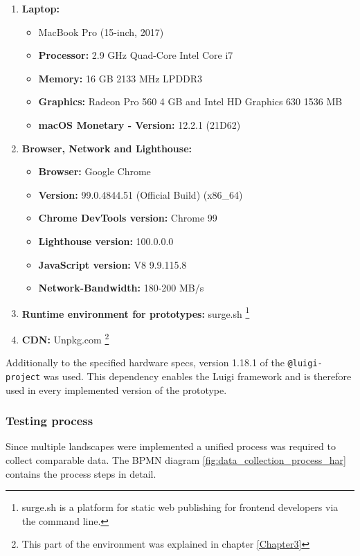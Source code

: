\begin{enumerate}
	\item \textbf{Laptop:}
	\begin{itemize}[noitemsep]
		\item MacBook Pro (15-inch, 2017)
		\item \textbf{Processor:} 2.9 GHz Quad-Core Intel Core i7
		\item \textbf{Memory:} 16 GB 2133 MHz LPDDR3 
		\item \textbf{Graphics:} Radeon Pro 560 4 GB and Intel HD Graphics 630 1536 MB
		\item \textbf{macOS Monetary - Version:} 12.2.1 (21D62)
	\end{itemize} 

	\item \textbf{Browser, Network and Lighthouse:}
	\begin{itemize}[noitemsep]
		\item \textbf{Browser:} Google Chrome
		\item \textbf{Version:} 99.0.4844.51 (Official Build) (x86\_64)
		\item \textbf{Chrome DevTools version:} Chrome 99
		\item \textbf{Lighthouse version:} 100.0.0.0
		\item \textbf{JavaScript version:} V8 9.9.115.8
		\item \textbf{Network-Bandwidth:} 180-200 MB/s
	\end{itemize}

	\item \textbf{Runtime environment for prototypes:} surge.sh \footnote{surge.sh is a platform for static web publishing
		for frontend developers via the command line.}
	
	\item \textbf{CDN:} Unpkg.com \footnote{This part of the environment was explained in chapter \ref{Chapter3}}
\end{enumerate}

Additionally to the specified hardware specs, version 1.18.1 of the \texttt{@luigi-project} was used. This dependency enables the Luigi framework and is therefore used in every implemented version of the prototype.

\subsubsection{Testing process}

Since multiple landscapes were implemented a unified process was required to collect comparable data. The BPMN diagram \ref{fig:data_collection_process_har} contains the process steps in detail.

